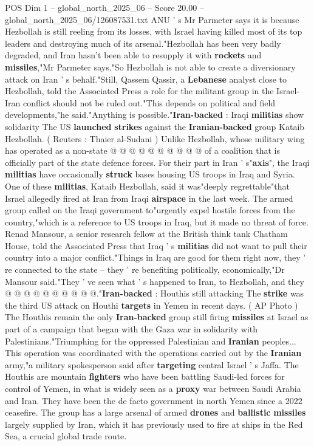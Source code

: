 \begin{textsample}{POS Dim 1 – global\_north\_2025\_06 – Score 20.00 – global\_north\_2025\_06/126087531.txt}
ANU ' s Mr Parmeter says it is because Hezbollah is still reeling from its losses, with Israel having killed most of its top leaders and destroying much of its arsenal."Hezbollah has been very badly degraded, and Iran hasn't been able to resupply it with \textbf{rockets} and \textbf{missiles},"Mr Parmeter says."So Hezbollah is not able to create a diversionary attack on Iran ' s behalf."Still, Qassem Qassir, a \textbf{Lebanese} analyst close to Hezbollah, told the Associated Press a role for the militant group in the Israel-Iran conflict should not be ruled out."This depends on political and field developments,"he said."Anything is possible."\textbf{Iran-backed} : Iraqi \textbf{militias} show solidarity The US \textbf{launched} \textbf{strikes} against the \textbf{Iranian-backed} group Kataib Hezbollah. ( Reuters : Thaier al-Sudani ) Unlike Hezbollah, whose military wing has operated as a non-state @ @ @ @ @ @ @ @ @ @ of a coalition that is officially part of the state defence forces.
For their part in Iran ' s"\textbf{axis}", the Iraqi \textbf{militias} have occasionally \textbf{struck} bases housing US troops in Iraq and Syria.
One of these \textbf{militias}, Kataib Hezbollah, said it was"deeply regrettable"that Israel allegedly fired at Iran from Iraqi \textbf{airspace} in the last week.
The armed group called on the Iraqi government to"urgently expel hostile forces from the country,"which is a reference to US troops in Iraq, but it made no threat of force.
Renad Mansour, a senior research fellow at the British think tank Chatham House, told the Associated Press that Iraq ' s \textbf{militias} did not want to pull their country into a major conflict."Things in Iraq are good for them right now, they ' re connected to the state -- they ' re benefiting politically, economically,"Dr Mansour said."They ' ve seen what ' s happened to Iran, to Hezbollah, and they @ @ @ @ @ @ @ @ @ @."\textbf{Iran-backed} : Houthis still attacking The \textbf{strike} was the third US attack on Houthi \textbf{targets} in Yemen in recent days. ( AP Photo ) The Houthis remain the only \textbf{Iran-backed} group still firing \textbf{missiles} at Israel as part of a campaign that began with the Gaza war in solidarity with Palestinians."Triumphing for the oppressed Palestinian and \textbf{Iranian} peoples...
This operation was coordinated with the operations carried out by the \textbf{Iranian} army,"a military spokesperson said after \textbf{targeting} central Israel ' s Jaffa.
The Houthis are mountain \textbf{fighters} who have been battling Saudi-led forces for control of Yemen, in what is widely seen as a \textbf{proxy} war between Saudi Arabia and Iran.
They have been the de facto government in north Yemen since a 2022 ceasefire.
The group has a large arsenal of armed \textbf{drones} and \textbf{ballistic} \textbf{missiles} largely supplied by Iran, which it has previously used to fire at ships in the Red Sea, a crucial global trade route.

\end{textsample}
